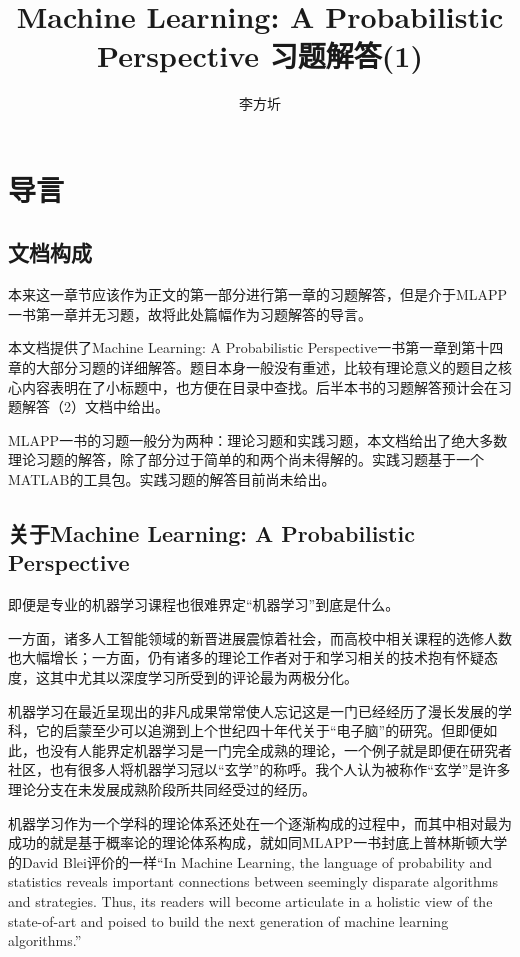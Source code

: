 \documentclass[UTF8]{ctexart}
\begin{document}
\title{Machine Learning: A Probabilistic Perspective 习题解答(1)}
\author{李方圻}
\maketitle
\tableofcontents
\newpage
\section{导言}
\subsection{文档构成}
本来这一章节应该作为正文的第一部分进行第一章的习题解答，但是介于MLAPP一书第一章并无习题，故将此处篇幅作为习题解答的导言。

本文档提供了Machine Learning: A Probabilistic Perspective一书第一章到第十四章的大部分习题的详细解答。题目本身一般没有重述，比较有理论意义的题目之核心内容表明在了小标题中，也方便在目录中查找。后半本书的习题解答预计会在习题解答（2）文档中给出。

MLAPP一书的习题一般分为两种：理论习题和实践习题，本文档给出了绝大多数理论习题的解答，除了部分过于简单的和两个尚未得解的。实践习题基于一个MATLAB的工具包。实践习题的解答目前尚未给出。

\subsection{关于Machine Learning: A Probabilistic Perspective}
即便是专业的机器学习课程也很难界定“机器学习”到底是什么。

一方面，诸多人工智能领域的新晋进展震惊着社会，而高校中相关课程的选修人数也大幅增长；一方面，仍有诸多的理论工作者对于和学习相关的技术抱有怀疑态度，这其中尤其以深度学习所受到的评论最为两极分化。

机器学习在最近呈现出的非凡成果常常使人忘记这是一门已经经历了漫长发展的学科，它的启蒙至少可以追溯到上个世纪四十年代关于“电子脑”的研究。但即便如此，也没有人能界定机器学习是一门完全成熟的理论，一个例子就是即便在研究者社区，也有很多人将机器学习冠以“玄学”的称呼。我个人认为被称作“玄学”是许多理论分支在未发展成熟阶段所共同经受过的经历。

机器学习作为一个学科的理论体系还处在一个逐渐构成的过程中，而其中相对最为成功的就是基于概率论的理论体系构成，就如同MLAPP一书封底上普林斯顿大学的David Blei评价的一样“In Machine Learning, the language of probability and statistics reveals important connections between seemingly disparate algorithms and strategies. Thus, its readers will become articulate in a holistic view of the state-of-art and poised to build the next generation of machine learning algorithms.”
\end{document}
